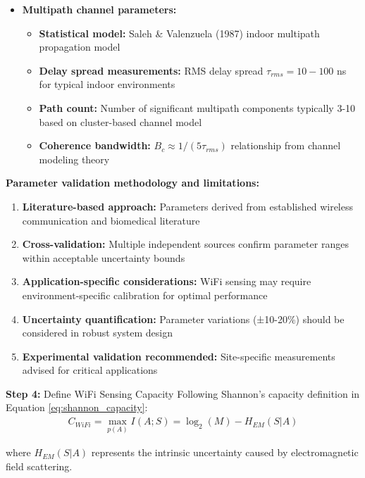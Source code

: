 \documentclass[12pt,a4paper]{article}
\begin{document}
\begin{itemize}
\begin{itemize}
\end{itemize}
\item \textbf{Multipath channel parameters:}
\begin{itemize}
\item \textbf{Statistical model:} Saleh \& Valenzuela (1987) \cite{saleh1987statistical} indoor multipath propagation model
\item \textbf{Delay spread measurements:} RMS delay spread $\tau_{rms} = 10-100$ ns for typical indoor environments
\item \textbf{Path count:} Number of significant multipath components typically 3-10 based on cluster-based channel model
\item \textbf{Coherence bandwidth:} $B_c \approx 1/(5\tau_{rms})$ relationship from channel modeling theory
\end{itemize}
\end{itemize}

\textbf{Parameter validation methodology and limitations:}
\begin{enumerate}
\item \textbf{Literature-based approach:} Parameters derived from established wireless communication and biomedical literature
\item \textbf{Cross-validation:} Multiple independent sources confirm parameter ranges within acceptable uncertainty bounds
\item \textbf{Application-specific considerations:} WiFi sensing may require environment-specific calibration for optimal performance
\item \textbf{Uncertainty quantification:} Parameter variations (±10-20\%) should be considered in robust system design
\item \textbf{Experimental validation recommended:} Site-specific measurements advised for critical applications
\end{enumerate}

\textbf{Step 4:} Define WiFi Sensing Capacity
Following Shannon's capacity definition in Equation \ref{eq:shannon_capacity}:
\begin{align}
C_{WiFi} = \max_{p(A)} I(A;S) = \log_2(M) - H_{EM}(S|A) \label{eq:wifi_capacity}
\end{align}

where $H_{EM}(S|A)$ represents the intrinsic uncertainty caused by electromagnetic field scattering.
\end{document}
